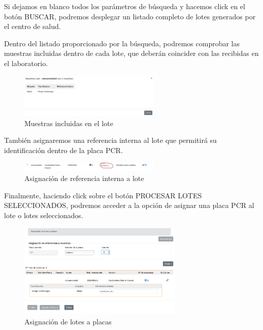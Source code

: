 \documentclass[a4paper,spanish]{paper}
\begin{document}
\medskip
\begin{tcolorbox}[colback=blue!3!white,colframe=blue(ryb)!50!black,title=\textbf{Tip}]

Si dejamos en blanco todos los parámetros de búsqueda y hacemos click en el botón BUSCAR, podremos desplegar un listado completo de lotes generados por el centro de salud.

\end{tcolorbox}

Dentro del listado proporcionado por la búsqueda, podremos comprobar las muestras incluidas dentro de cada lote, que deberán coincider con las recibidas en el laboratorio.

\begin{figure}[h]
\centering
\includegraphics[width=0.6\textwidth]{Figs/Fig16.png}
\caption{Muestras incluidas en el lote}
\label{Fig16}
\end{figure}

También asignaremos una referencia interna al lote que permitirá su identificación dentro de la placa PCR.

\begin{figure}[h]
\centering
\includegraphics[width=0.6\textwidth]{Figs/Fig17.png}
\caption{Asignación de referencia interna a lote}
\label{Fig17}
\end{figure}

Finalmente, haciendo click sobre el botón PROCESAR LOTES SELECCIONADOS, podremos acceder a la opción de asignar una placa PCR al lote o lotes seleccionados.

\begin{figure}[h]
\centering
\includegraphics[width=0.7\textwidth]{Figs/Fig18.png}
\caption{Asignación de lotes a placas}
\label{Fig18}
\end{figure}
\end{document}
